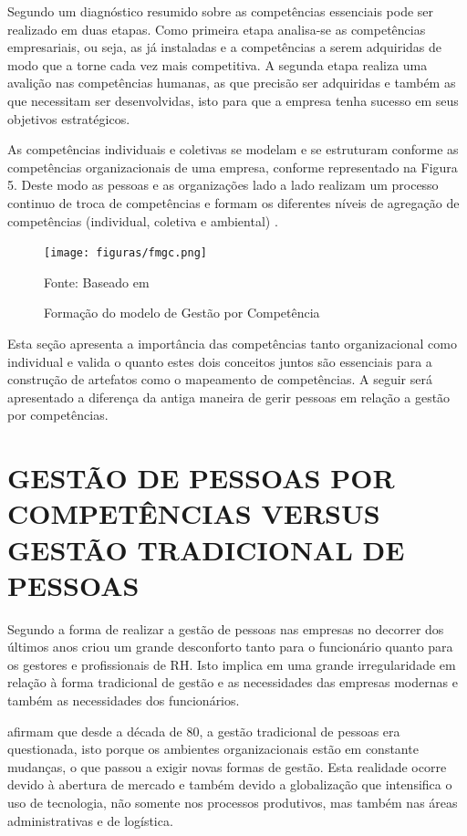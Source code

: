 Segundo  um diagnóstico resumido sobre as competências essenciais pode ser realizado em duas etapas. Como primeira etapa analisa-se as competências empresariais, ou seja, as já instaladas e a competências a serem adquiridas de modo que a torne cada vez mais competitiva. A segunda etapa realiza uma avalição nas competências humanas, as que precisão ser adquiridas e também as que necessitam ser desenvolvidas, isto para que a empresa tenha sucesso em seus objetivos estratégicos.

As competências individuais e coletivas se modelam e se estruturam conforme as competências organizacionais de uma empresa, conforme representado na Figura 5. Deste modo as pessoas e as organizações lado a lado realizam um processo continuo de troca de competências e formam os diferentes níveis de agregação de competências (individual, coletiva e ambiental) \cite{zago2013cultura}.

\begin{figure}[htbp]
	\centering
	\label{fig:modelo_por_competencia}
	\caption{Formação do modelo de Gestão por Competência}
	\centering
	\texttt{[image: figuras/fmgc.png]}

	\footnotesize Fonte: Baseado em 
\end{figure}

Esta seção apresenta a importância das competências tanto organizacional como individual e valida o quanto estes dois conceitos juntos são essenciais para a construção de artefatos como o mapeamento de competências. A seguir será apresentado a diferença da antiga maneira de gerir pessoas em relação a gestão por competências.


\section{GESTÃO DE PESSOAS POR COMPETÊNCIAS VERSUS GESTÃO TRADICIONAL DE PESSOAS}

Segundo  a forma de realizar a gestão de pessoas nas empresas no decorrer dos últimos anos criou um grande desconforto tanto para o funcionário quanto para os gestores e profissionais de RH. Isto implica em uma grande irregularidade em relação à forma tradicional de gestão e as necessidades das empresas modernas e também as necessidades dos funcionários.

 afirmam que desde a década de 80, a gestão tradicional de pessoas era questionada, isto porque os ambientes organizacionais estão em constante mudanças, o que passou a exigir novas formas de gestão. Esta realidade ocorre devido à abertura de mercado e também devido a globalização que intensifica o uso de tecnologia, não somente nos processos produtivos, mas também nas áreas administrativas e de logística.

